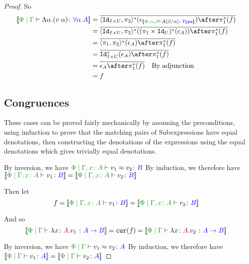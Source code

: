 \documentclass{report}
\begin{document}
\begin{framed}
\begin{proof}
            So
            \begin{align*}
                \deno{\gpetyperelation{\elam{\a}{(\eapp{v}{\a})}}{\all{\a}{A}}} & = \bar{\pr{\Id{I\times U}}{\pp}\star(\e_{\deno{\typerelation{\P,\a,\b}{A\ssub{\a}{\b}}{\type}}})\after\pstar(f)}\\
                & = \bar{\pr{\Id{I\times U}}{\pp}\star((\p\times\Id{U})\star(\e_A))\after\pstar(f)}\\
                & = \bar{\pr{\p}{\pp}\star(\e_A)\after\pstar(f)}\\
                &= \bar{\Id{I\times U}\star(\e_A)\after\pstar(f)}\\
                & = \bar{\e_A\after \pstar(f)}\qt{By adjunction}\\
                & = f
            \end{align*}
        
        \subsection{Congruences}
        These cases can be proved fairly mechanically by assuming the preconditions, using induction to prove that the matching pairs of Subexpressions have equal denotations, then constructing the denotations of the expressions using the equal denotations which gives trivially equal denotations.
        
        \case{\eqfun}
            By inversion, we have $\eberelation{\P}{\gax}{v_1}{v_2}{B}$
            By induction, we therefore have $\deno{\etyperelation{\P}{\gax}{v_1}{B}} = \deno{\etyperelation{\P}{\gax}{v_2}{B}}$
        
            Then let
            \begin{equation}
                f = \deno{\etyperelation{\P}{\gax}{v_1}{B}} = \deno{\etyperelation{\P}{\gax}{v_2}{B}}
            \end{equation}
        
            And so
            \begin{equation}
                \deno{\gpetyperelation{\lam{x}{A}{v_1}}{\ab}} = \cur{f} = \deno{\gpetyperelation{\lam{x}{A}{v_2}}{\ab}}
            \end{equation}
        
        
        \case{\eqreturn}
        By inversion, we have $\gpeberelation{v_1}{v_2}{A}$
        By induction, we therefore have $\deno{\gpetyperelation{v_1}{A}} = \deno{\gpetyperelation{v_2}{A}}$
        

\end{proof}
\end{framed}
\end{document}
